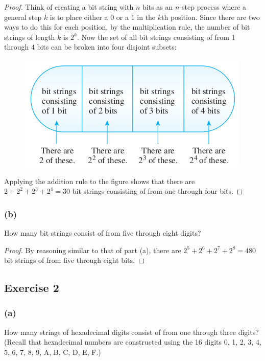 \documentclass[14pt]{extarticle}
\begin{document}
\begin{proof}
Think of creating a bit string with $n$ bits as an $n$-step process where a general step $k$ is to place either a 0 or 
a 1 in the $k$th position. Since there are two ways to do this for each position, by the multiplication rule, the 
number of bit strings of length $k$ is $2^k$. Now the set of all bit strings consisting of from 1 through 4 bits can 
be broken into four disjoint subsets:

\begin{figure}[ht!]
\centering
\includegraphics[scale=0.45]{../images/9.3.1.a.png}
\end{figure}

Applying the addition rule to the figure shows that there are \(2 + 2^2 + 2^3 + 2^4 = 30\) bit strings consisting of 
from one through four bits.
\end{proof}

\subsubsection{(b)}
How many bit strings consist of from five through eight digits?

\begin{proof}
By reasoning similar to that of part (a), there are \(2^5 + 2^6 + 2^7 + 2^8 = 480\) bit strings of from five through 
eight bits.
\end{proof}

\subsection{Exercise 2}
\subsubsection{(a)}
How many strings of hexadecimal digits consist of from one through three digits? (Recall that hexadecimal numbers are 
constructed using the 16 digits 0, 1, 2, 3, 4, 5, 6, 7, 8, 9, A, B, C, D, E, F.)
\end{document}
